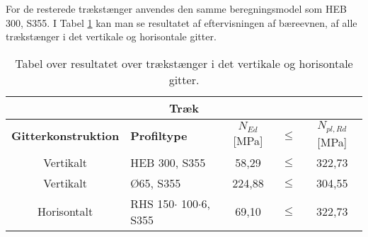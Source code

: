 For de resterede trækstænger anvendes den samme beregningsmodel som HEB 300, S355. I Tabel \ref{tab:ResulTrak} kan man se resultatet af eftervisningen af bæreevnen, af alle trækstænger i det vertikale og horisontale gitter.
\begin{table}[H]
\centering

\begin{tabular}{|c|l|c|c|c|} 
\hline
\multicolumn{5}{|c|}{\textbf{Træk}}                                                   \\ \hline
\textbf{Gitterkonstruktion} & \textbf{Profiltype}            & $N_{Ed}$ {[}MPa{]} & $\leq$ & $N_{pl,Rd}$ {[}MPa{]} \\ \hline
Vertikalt          & HEB 300, S355         & 58,29           &$\leq$  & 322,73     \\ \hline
Vertikalt          & Ø65, S355            & 224,88          &$\leq$  & 304,55   \\ \hline
Horisontalt        & RHS 150$ \cdot$ 100$\cdot $6, S355 & 69,10          & $\leq$ & 322,73     \\ \hline
\end{tabular}
\caption{Tabel over resultatet over trækstænger i det vertikale og horisontale gitter.}
\label{tab:ResulTrak}
\end{table}


